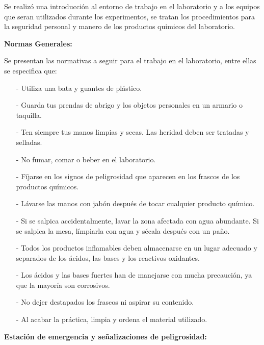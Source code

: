 Se realizó una introducción al entorno de trabajo en el laboratorio y a los equipos que seran utilizados durante los experimentos, se tratan los procedimientos para la seguridad personal y manero de los productos quimicos del laboratorio.

\textbf{\textcolor{azul50}{Normas Generales:}}

Se presentan las normativas a seguir para el trabajo en el laboratorio, entre ellas se especifica que:\\[-1cm]
\begin{itemize}
    \item[-] Utiliza una bata y guantes de plástico. \\[-.6cm]
    \item[-] Guarda tus prendas de abrigo y los objetos personales en un armario o taquilla.\\[-.6cm]
    \item[-] Ten siempre tus manos limpias y secas. Las heridad deben ser tratadas y selladas.\\[-.6cm]
    \item[-] No fumar, comar o beber en el laboratorio.\\[-.6cm]
    \item[-] Fíjarse en los signos de peligrosidad que aparecen en los frascos de los productos químicos.\\[-.6cm]
    \item[-] Lávarse las manos con jabón después de tocar cualquier producto químico.\\[-.6cm]
    \item[-] Si se salpica accidentalmente, lavar la zona afectada con agua abundante. Si se salpica la mesa, límpiarla con agua y sécala después con un paño.\\[-.6cm]
    \item[-] Todos los productos inflamables deben almacenarse en un lugar adecuado y separados de los ácidos, las bases y los reactivos oxidantes.\\[-.6cm]
    \item[-] Los ácidos y las bases fuertes han de manejarse con mucha precaución, ya que la mayoría son corrosivos.\\[-.6cm]
    \item[-] No dejer destapados los frascos ni aspirar su contenido.\\[-.6cm]
    \item[-] Al acabar la práctica, limpia y ordena el material utilizado.
\end{itemize}
\textbf{\textcolor{azul50}{Estación de emergencia y señalizaciones de peligrosidad:}}

